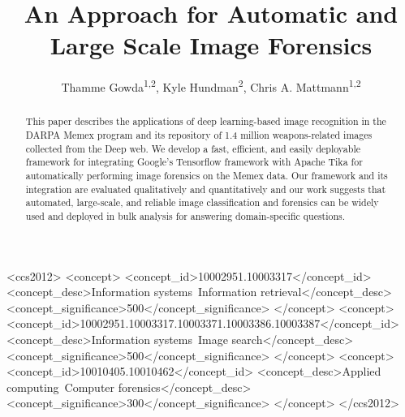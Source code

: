 \documentclass[sigconf]{acmart}
\begin{document}
\title[Automatic Large Scale Image Forensics]{An Approach for Automatic and Large Scale Image Forensics} %
\author{Thamme Gowda\textsuperscript{1,2}, Kyle Hundman\textsuperscript{2}, Chris A. Mattmann\textsuperscript{1,2}}

\renewcommand{\shortauthors}{T. Gowda, K. Hundman, C. Mattmann}




\begin{abstract}
This paper describes the applications of deep learning-based image recognition in the DARPA Memex program and its repository of 1.4 million weapons-related images collected from the Deep web. We develop a fast, efficient, and easily deployable framework for integrating Google's Tensorflow framework with Apache Tika for automatically performing image forensics on the Memex data. Our framework and its integration are evaluated qualitatively and quantitatively and our work suggests that automated, large-scale, and reliable image classification and forensics can be widely used and deployed in bulk analysis for answering domain-specific questions.
\end{abstract}

%
%
\begin{CCSXML}
<ccs2012>
<concept>
<concept_id>10002951.10003317</concept_id>
<concept_desc>Information systems~Information retrieval</concept_desc>
<concept_significance>500</concept_significance>
</concept>
<concept>
<concept_id>10002951.10003317.10003371.10003386.10003387</concept_id>
<concept_desc>Information systems~Image search</concept_desc>
<concept_significance>500</concept_significance>
</concept>
<concept>
<concept_id>10010405.10010462</concept_id>
<concept_desc>Applied computing~Computer forensics</concept_desc>
<concept_significance>300</concept_significance>
</concept>
</ccs2012>
\end{CCSXML}
\end{document}
